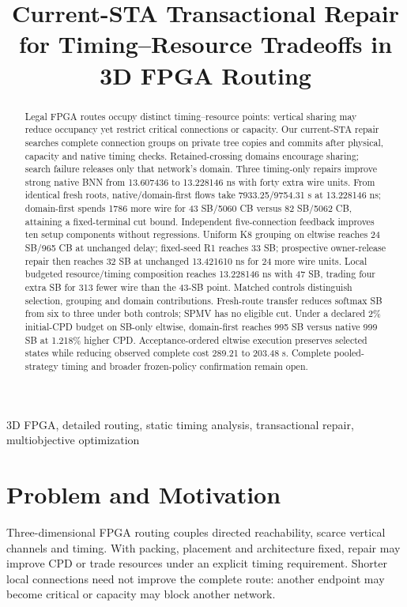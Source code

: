 \documentclass[conference,10pt]{IEEEtran}
\title{Current-STA Transactional Repair for Timing--Resource Tradeoffs in 3D FPGA Routing}
\author{\IEEEauthorblockN{Anonymous development manuscript}}
\begin{document}
\maketitle
\begin{abstract}
Legal FPGA routes occupy distinct timing--resource points: vertical sharing may reduce occupancy yet restrict critical connections or capacity. Our current-STA repair searches complete connection groups on private tree copies and commits after physical, capacity and native timing checks. Retained-crossing domains encourage sharing; search failure releases only that network's domain. Three timing-only repairs improve strong native BNN from 13.607436 to 13.228146 ns with forty extra wire units. From identical fresh roots, native/domain-first flows take 7933.25/9754.31 s at 13.228146 ns; domain-first spends 1786 more wire for 43 SB/5060 CB versus 82 SB/5062 CB, attaining a fixed-terminal cut bound. Independent five-connection feedback improves ten setup components without regressions. Uniform K8 grouping on eltwise reaches 24 SB/965 CB at unchanged delay; fixed-seed R1 reaches 33 SB; prospective owner-release repair then reaches 32 SB at unchanged 13.421610 ns for 24 more wire units. Local budgeted resource/timing composition reaches 13.228146 ns with 47 SB, trading four extra SB for 313 fewer wire than the 43-SB point. Matched controls distinguish selection, grouping and domain contributions. Fresh-route transfer reduces softmax SB from six to three under both controls; SPMV has no eligible cut. Under a declared 2\% initial-CPD budget on SB-only eltwise, domain-first reaches 995 SB versus native 999 SB at 1.218\% higher CPD. Acceptance-ordered eltwise execution preserves selected states while reducing observed complete cost 289.21 to 203.48 s. Complete pooled-strategy timing and broader frozen-policy confirmation remain open.
\end{abstract}
\begin{IEEEkeywords}
3D FPGA, detailed routing, static timing analysis, transactional repair, multiobjective optimization
\end{IEEEkeywords}

\section{Problem and Motivation}
Three-dimensional FPGA routing couples directed reachability, scarce vertical channels and timing. With packing, placement and architecture fixed, repair may improve CPD or trade resources under an explicit timing requirement. Shorter local connections need not improve the complete route: another endpoint may become critical or capacity may block another network.
\end{document}
